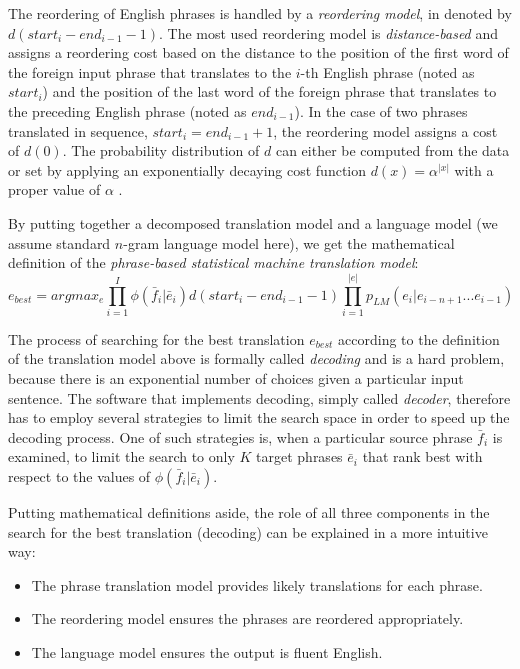 The reordering of English phrases is handled by a \emph{reordering model}, in 
denoted by $d(start_i - end_{i-1} - 1)$.
The most used reordering model is \emph{distance-based} and assigns a reordering cost based
on the distance to the position of the first word of the foreign input phrase that translates to
the $i$-th English phrase (noted as $start_i$) and the position of the last word of the foreign
phrase that translates to the preceding English phrase (noted as $end_{i-1}$).
In the case of two phrases translated in sequence, $start_i = end_{i-1} +1$, the
reordering model assigns a cost of $d(0)$.
The probability distribution of $d$ can either be computed from the data or set by applying
an exponentially decaying cost function $d(x) = \alpha^{|x|}$ with a proper value of $\alpha$
\citep{koehn:smt}.

By putting together a decomposed translation model and a language model (we assume standard $n$-gram
language model here), we get the mathematical definition of the
\emph{phrase-based statistical machine translation model}:
\begin{equation} \label{eq:pbsmt}
  e_{best} = argmax_e \prod_{i=1}^I \phi(\bar{f}_i|\bar{e}_i) d(start_i - end_{i-1} - 1) \prod_{i=1}^{|e|} p_{LM}(e_i|e_{i-n+1}...e_{i-1})
\end{equation}

The process of searching for the best translation $e_{best}$ according to the definition of
the translation model above is formally called \emph{decoding} and is a hard problem,
because there is an exponential number of choices given a particular input sentence.
The software that implements decoding, simply called \emph{decoder}, therefore has to employ
several strategies to limit the search space in order to speed up the decoding process.
One of such strategies is, when a particular source phrase $\bar{f}_i$ is examined,
to limit the search to only $K$ target phrases $\bar{e}_i$ that rank best
with respect to the values of $\phi(\bar{f}_i|\bar{e}_i)$.

Putting mathematical definitions aside, the role of all three components in the search for
the best translation (decoding) can be explained in a more intuitive way:
\begin{itemize}
  \item The phrase translation model provides likely translations for each phrase.
  \item The reordering model ensures the phrases are reordered appropriately.
  \item The language model ensures the output is fluent English.
\end{itemize}

